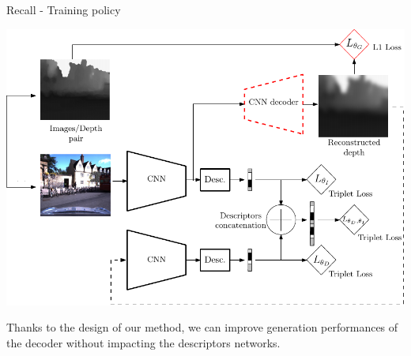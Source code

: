 \begin{frame}{Recall - Training policy}
	\begin{minipage}{0.6\linewidth}
		\centering
		\includegraphics[width=\linewidth]{vect/method/fig3/6d}	
	\end{minipage}\hfill
	\begin{minipage}{0.3\linewidth}
		\raggedright
		Thanks to the design of our method, we can improve generation performances of the decoder without impacting the descriptors networks.
		
	\end{minipage}			
\end{frame}


